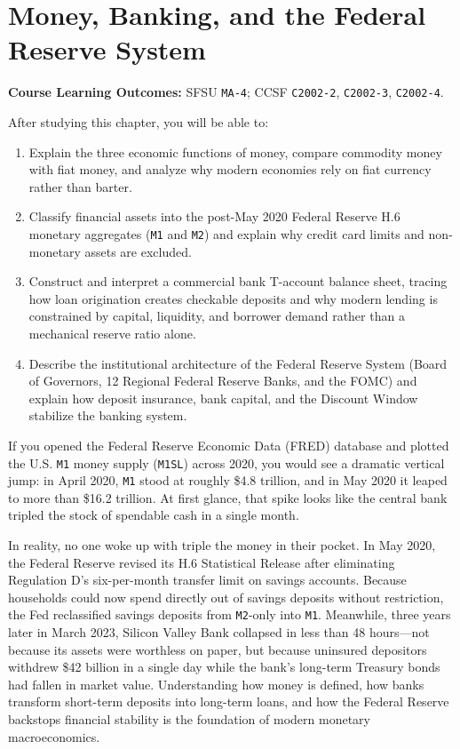 \documentclass[11pt, oneside]{book}
\begin{document}
\chapter{Money, Banking, and the Federal Reserve System}

\begin{learningbox}
\textbf{Course Learning Outcomes:} SFSU \texttt{MA-4}; CCSF \texttt{C2002-2}, \texttt{C2002-3}, \texttt{C2002-4}.

\medskip
\noindent After studying this chapter, you will be able to:
\begin{enumerate}[leftmargin=1.5em, itemsep=3pt]
  \item Explain the three economic functions of money, compare commodity money with fiat money, and analyze why modern economies rely on fiat currency rather than barter.
  \item Classify financial assets into the post-May 2020 Federal Reserve H.6 monetary aggregates (\texttt{M1} and \texttt{M2}) and explain why credit card limits and non-monetary assets are excluded.
  \item Construct and interpret a commercial bank T-account balance sheet, tracing how loan origination creates checkable deposits and why modern lending is constrained by capital, liquidity, and borrower demand rather than a mechanical reserve ratio alone.
  \item Describe the institutional architecture of the Federal Reserve System (Board of Governors, 12 Regional Federal Reserve Banks, and the FOMC) and explain how deposit insurance, bank capital, and the Discount Window stabilize the banking system.
\end{enumerate}
\end{learningbox}

\begin{bringithome}
If you opened the Federal Reserve Economic Data (FRED) database and plotted the U.S. \texttt{M1} money supply (\texttt{M1SL}) across 2020, you would see a dramatic vertical jump: in April 2020, \texttt{M1} stood at roughly \$4.8 trillion, and in May 2020 it leaped to more than \$16.2 trillion. At first glance, that spike looks like the central bank tripled the stock of spendable cash in a single month.

In reality, no one woke up with triple the money in their pocket. In May 2020, the Federal Reserve revised its H.6 Statistical Release after eliminating Regulation D's six-per-month transfer limit on savings accounts. Because households could now spend directly out of savings deposits without restriction, the Fed reclassified savings deposits from \texttt{M2}-only into \texttt{M1}. Meanwhile, three years later in March 2023, Silicon Valley Bank collapsed in less than 48 hours—not because its assets were worthless on paper, but because uninsured depositors withdrew \$42 billion in a single day while the bank's long-term Treasury bonds had fallen in market value. Understanding how money is defined, how banks transform short-term deposits into long-term loans, and how the Federal Reserve backstops financial stability is the foundation of modern monetary macroeconomics.
\end{bringithome}
\end{document}
